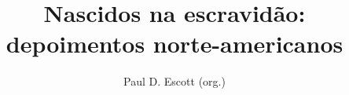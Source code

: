 \documentclass[12pt]{extarticle}
\begin{document}
\newcommand{\AutorLivro}{Paul D. Escott (org.)}
\newcommand{\TituloLivro}{Nascidos na escravidão: depoimentos norte-americanos}
\newcommand{\Tema}{Diálogos com a sociologia e com a antropologia}
\newcommand{\Genero}{Relatos e memórias}
\newcommand{\issnppub}{---}
\newcommand{\issnepub}{---}
\newcommand{\colaborador}{\textbf{Eduardo Modesto de Carvalho, Bruno Gradella e Vicente Castro} é uma pessoa incrível e vai fazer um bom serviço.}


\title{\TituloLivro}
\author{\AutorLivro}
\def\authornotes{\colaborador}

\date{}
\maketitle
\end{document}
